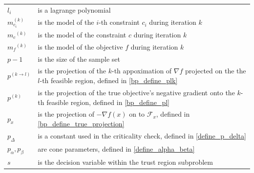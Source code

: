 \documentclass{article}
\theoremstyle{case}
\numberwithin{theorem}{subsection}
\newcommand{\mcik}{{{m}^{(k)}_{c_i}}}
\newcommand{\mck}{{{m}_{c}}^{(k)}}
\newcommand{\mfk}{{{m}_f}^{(k)}}
\begin{document}
\begin{longtable}{| p{} | p{} |}
$l_i$ & is a lagrange polynomial \\ %
$\mcik$ & is the model of the $i$-th constraint $c_i$ during iteration $k$\\ %
$\mck$ & is the model of the constraint $c$ during iteration $k$\\ %
$\mfk$ & is the model of the objective $f$ during iteration $k$\\ %
$p-1$ & is the size of the sample set \\ %
$p^{(k \to l)}$ & is the projection of the $k$-th appoximation of $\nabla f$ projected on the the $l$-th feasible region, defined in \cref{bp_define_plk} \\ %
$p^{(k)}$ & is the projection of the true objective's negative gradient onto the $k$-th feasible region, defined in \cref{bp_define_pl} \\ %
$p_x$ & is the projection of $-\nabla f(x)$ on to $\mathcal F_x$, defined in \cref{bp_define_true_projection} \\ %
$p_{\Delta}$ & is a constant used in the criticality check, defined in  \cref{define_p_delta} \\ %
$p_{\alpha}, p_{\beta}$ & are cone parameters, defined in \cref{define_alpha_beta} \\ %
$s$ & is the decision variable within the trust region subproblem \\ %

\end{longtable}
\end{document}
